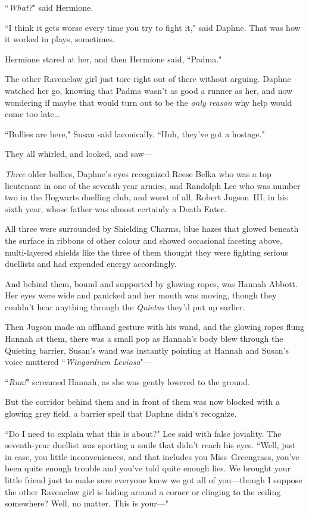 ``\emph{What?}" said Hermione.

``I think it gets worse every time you try to fight it," said Daphne. That was how it worked in plays, sometimes.

Hermione stared at her, and then Hermione said, ``Padma."

The other Ravenclaw girl just tore right out of there without arguing. Daphne watched her go, knowing that Padma wasn't as good a runner as her, and now wondering if maybe that would turn out to be the \emph{only reason} why help would come too late{\ldots}

``Bullies are here," Susan said laconically. ``Huh, they've got a hostage."

They all whirled, and looked, and saw—

\emph{Three} older bullies, Daphne's eyes recognized Reese Belka who was a top lieutenant in one of the seventh-year armies, and Randolph Lee who was number two in the Hogwarts duelling club, and worst of all, Robert Jugson~III, in his sixth year, whose father was almost certainly a Death Eater.

All three were surrounded by Shielding Charms, blue hazes that glowed beneath the surface in ribbons of other colour and showed occasional faceting above, multi-layered shields like the three of them thought they were fighting serious duellists and had expended energy accordingly.

And behind them, bound and supported by glowing ropes, was Hannah Abbott. Her eyes were wide and panicked and her mouth was moving, though they couldn't hear anything through the \emph{Quietus} they'd put up earlier.

Then Jugson made an offhand gesture with his wand, and the glowing ropes flung Hannah at them, there was a small pop as Hannah's body blew through the Quieting barrier, Susan's wand was instantly pointing at Hannah and Susan's voice muttered ``\emph{Wingardium Leviosa}"—

``\emph{Run!}" screamed Hannah, as she was gently lowered to the ground.

But the corridor behind them and in front of them was now blocked with a glowing grey field, a barrier spell that Daphne didn't recognize.

``Do I need to explain what this is about?" Lee said with false joviality. The seventh-year duellist was sporting a smile that didn't reach his eyes. ``Well, just in case, you little inconveniences, and that includes you Miss~Greengrass, you've been quite enough trouble and you've told quite enough lies. We brought your little friend just to make sure everyone knew we got all of you—though I suppose the other Ravenclaw girl is hiding around a corner or clinging to the ceiling somewhere? Well, no matter. This is your—"

